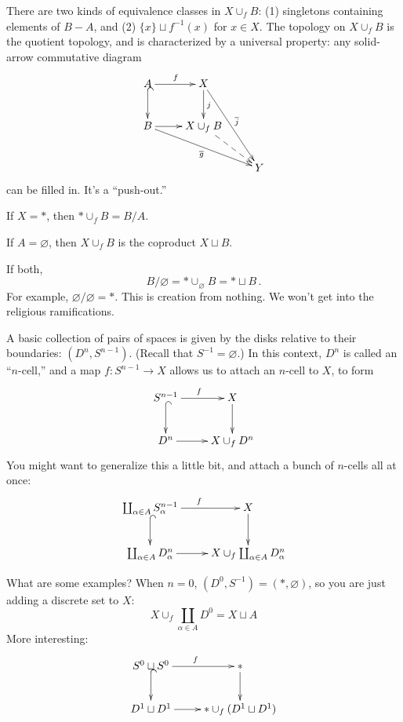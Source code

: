 There are two kinds of equivalence classes in $X\cup_fB$: (1) singletons containing elements of $B-A$, and (2) $\{x\}\sqcup f^{-1}(x)$ for $x\in X$.
The topology on $X\cup_fB$ is the quotient topology, and is characterized
by a universal property: any solid-arrow commutative diagram
\begin{equation*}
\xymatrix{A\ar[r]^f\ar@{^(->}[d] & X\ar[d]^j\ar[ddr]^{\overline{j}} & \\
B\ar[r]\ar[drr]_{\overline{g}} & X\cup_f B\ar@{-->}[dr] & \\
 & & Y}
\end{equation*}
can be filled in. It's a ``push-out.''
\begin{example}
If $X=\ast$, then $\ast\cup_f B=B/A$.
\end{example}
\begin{example}
If $A=\varnothing$, then $X\cup_fB$ is the coproduct $X\sqcup B$. 
\end{example}
\begin{example}
If both, 
\[
B/\varnothing=\ast\cup_\varnothing B=\ast\sqcup B\,.
\]
For example, $\varnothing/\varnothing=\ast$. 
This is creation from nothing. We won't get into the religious ramifications.
\end{example}
\begin{example}
A basic collection of pairs of spaces is given by the disks relative to their
boundaries: $(D^n,S^{n-1})$. (Recall that $S^{-1}=\varnothing$.) In this
context, $D^n$ is called an ``$n$-cell,'' and a map $f:S^{n-1}\to X$ allows
us to attach an $n$-cell to $X$, to form 
\begin{equation*}
\xymatrix{S^{n-1}\ar[r]^f\ar@{^(->}[d] & X\ar[d]\\
D^n\ar[r] & X\cup_f D^n}
\end{equation*}
You might want to generalize this a little bit, and attach a bunch of $n$-cells all at once:
\begin{equation*}
\xymatrix{\coprod_{\alpha\in A}S^{n-1}_\alpha\ar[r]^f\ar@{^(->}[d] & X\ar[d]\\
\coprod_{\alpha\in A}D^n_\alpha\ar[r] & X\cup_f \coprod_{\alpha\in A}D^n_\alpha}
\end{equation*}
\end{example}
What are some examples? When $n=0$, $(D^0,S^{-1})=(\ast,\varnothing)$, so 
you are just adding a discrete set to $X$:
\[
X\cup_f\coprod_{\alpha\in A}D^0=X\sqcup A
\]
More interesting: 
\begin{equation*}
\xymatrix{S^0\sqcup S^0\ar[r]^f\ar@{^(->}[d] & \ast\ar[d]\\
D^1\sqcup D^1\ar[r] & \ast\cup_f (D^1\sqcup D^1)}
\end{equation*}
